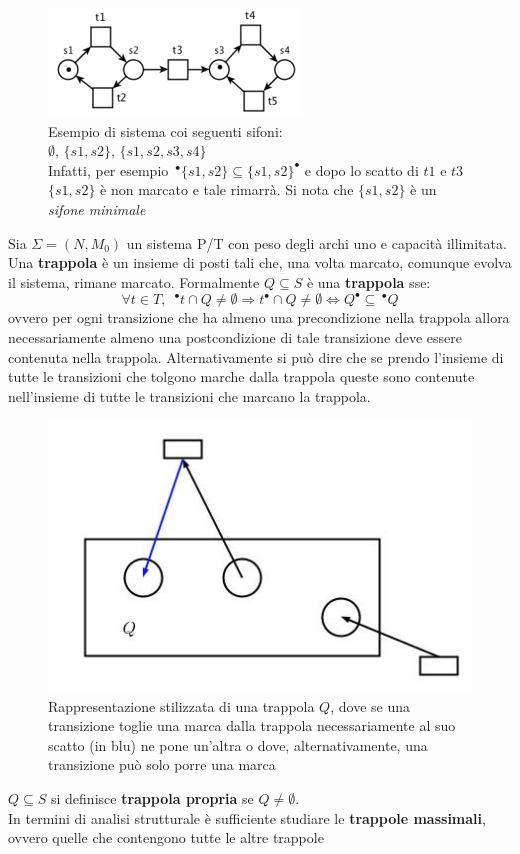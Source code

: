 \documentclass[a4paper,12pt, oneside]{book}
\begin{document}
\begin{figure}[H]
  \centering
  \includegraphics[scale = 0.6]{img/sfi2.jpg}
  \caption{Esempio di sistema coi seguenti sifoni: \\
    $\emptyset,\,\{s1 ,s2\},\,\{s1 , s2 , s3 , s4\}$\\
    Infatti, per esempio
    $\,^\bullet\{s1,s2\}\subseteq \{s1,s2\}^\bullet$ e dopo lo scatto di $t1$
    e $t3$ $\{s1,s2\}$ è non marcato e tale rimarrà. Si nota che $\{s1,s2\}$ è
    un \emph{sifone minimale}}
\end{figure}
\begin{definizione}
  Sia $\Sigma=(N,M_0)$ un sistema P/T con peso degli archi uno e capacità
  illimitata. \\
  Una \textbf{trappola} è un insieme di posti tali che, una volta marcato,
  comunque evolva il sistema, rimane marcato. Formalmente $Q\subseteq S$ è una
  \textbf{trappola} sse:
  \[\forall t\in T, \,\,\,^\bullet t\cap Q\neq \emptyset\Rightarrow t^\bullet
    \cap Q\neq \emptyset \Longleftrightarrow Q^\bullet \subseteq \,^\bullet Q\]
  ovvero per ogni transizione che ha almeno una precondizione nella trappola
  allora necessariamente almeno una postcondizione di tale transizione deve
  essere contenuta nella trappola. Alternativamente si può dire che se prendo
  l'insieme di tutte le transizioni che tolgono marche dalla trappola queste
  sono contenute nell'insieme di tutte le transizioni che marcano la trappola.
  \begin{figure}[H]
    \centering
    \includegraphics[scale = 0.45]{img/sif3.jpg}
    \caption{Rappresentazione stilizzata di una trappola $Q$, dove se una
      transizione toglie  una marca dalla trappola necessariamente al
      suo scatto (in blu) ne pone un'altra o dove, alternativamente, una
      transizione può solo porre una marca}   
  \end{figure}
  $Q\subseteq S$ si definisce \textbf{trappola propria} se $Q\neq \emptyset$.\\
  In termini di analisi strutturale è sufficiente studiare le \textbf{trappole
    massimali}, ovvero quelle che contengono tutte le altre trappole 
\end{definizione}
\end{document}

